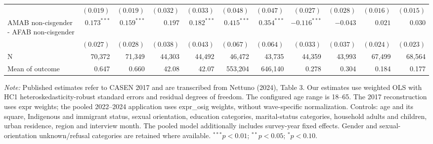 \begin{table}[htbp]
{\begin{tabular}{l*{10}{r}}
 & $(0.019)$ & $(0.019)$ & $(0.032)$ & $(0.033)$ & $(0.048)$ & $(0.047)$ & $(0.027)$ & $(0.028)$ & $(0.016)$ & $(0.015)$ \\
AMAB non-cisgender - AFAB non-cisgender & $0.173^{***}$ & $0.159^{***}$ & $0.197$ & $0.182^{***}$ & $0.415^{***}$ & $0.354^{***}$ & $-0.116^{***}$ & $-0.043$ & $0.021$ & $0.030$ \\
 & $(0.027)$ & $(0.028)$ & $(0.038)$ & $(0.043)$ & $(0.067)$ & $(0.064)$ & $(0.033)$ & $(0.037)$ & $(0.024)$ & $(0.023)$ \\
\midrule
N & 70,372 & 71,349 & 44,303 & 44,492 & 46,472 & 43,735 & 44,359 & 43,993 & 67,499 & 68,564 \\
Mean of outcome & 0.647 & 0.660 & 42.08 & 42.07 & 553,204 & 646,140 & 0.278 & 0.304 & 0.184 & 0.177 \\
\bottomrule
\end{tabular}%
}
\par\smallskip
\footnotesize\textit{Note:} Published estimates refer to CASEN 2017 and are transcribed from Nettuno (2024), Table 3. Our estimates use weighted OLS with HC1 heteroskedasticity-robust standard errors and residual degrees of freedom. The configured age range is 18--65. The 2017 reconstruction uses expr weights; the pooled 2022--2024 application uses expr\_osig weights, without wave-specific normalization. Controls: age and its square, Indigenous and immigrant status, sexual orientation, education categories, marital-status categories, household adults and children, urban residence, region and interview month. The pooled model additionally includes survey-year fixed effects. Gender and sexual-orientation unknown/refusal categories are retained where available. $^{***}p<0.01$; $^{**}p<0.05$; $^{*}p<0.10$.
\end{table}
